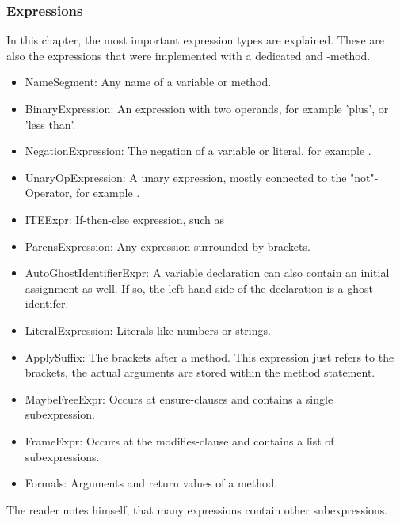 \subsubsection{Expressions}
In this chapter, the most important expression types are explained.
These are also the expressions that were implemented with a dedicated  and -method.
\begin{itemize}

    \item NameSegment: Any name of a variable or method.
    \item BinaryExpression: An expression with two operands, for example 'plus', or 'less than'.
    \item NegationExpression: The negation of a variable or literal, for example .
    \item UnaryOpExpression: A unary expression, mostly connected to the "not"-Operator, for example .
    \item ITEExpr: If-then-else expression, such as 
    \item ParensExpression: Any expression surrounded by brackets.
    \item AutoGhostIdentifierExpr: A variable declaration can also contain an initial assignment as well. If so, the left hand side of the declaration is a ghost-identifer.
    \item LiteralExpression: Literals like numbers or strings.
    \item ApplySuffix: The brackets after a method. This expression just refers to the brackets, the actual arguments are stored within the method statement.
    \item MaybeFreeExpr: Occurs at ensure-clauses and contains a single subexpression.
    \item FrameExpr: Occurs at the modifies-clause and contains a list of subexpressions.
    \item Formals: Arguments and return values of a method.
\end{itemize}
The reader notes himself, that many expressions contain other subexpressions.

